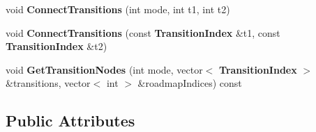\begin{DoxyCompactItemize}
\item 
void {\bfseries Connect\+Transitions} (int mode, int t1, int t2)\label{classMultiModalPRM_a6893a8da2b46d5f5ec39bdece0c85f1c}

\item 
void {\bfseries Connect\+Transitions} (const {\bf Transition\+Index} \&t1, const {\bf Transition\+Index} \&t2)\label{classMultiModalPRM_aa7a9de1acd05cc017c38ad944ecafe17}

\item 
void {\bfseries Get\+Transition\+Nodes} (int mode, vector$<$ {\bf Transition\+Index} $>$ \&transitions, vector$<$ int $>$ \&roadmap\+Indices) const \label{classMultiModalPRM_ad8d72c9a63b95146d9319f900e02675b}

\end{DoxyCompactItemize}
\subsection*{Public Attributes}
